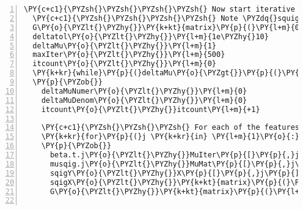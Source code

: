 \begin{Verbatim}[commandchars=\\\{\},codes={\catcode`\$=3\catcode`\^=7\catcode`\_=8},gobble=0,numbers=left,fontfamily=fvm,fontshape=n,fontsize=\footnotesize,tabsize=2]
  \PY{c+c1}{\PYZsh{}\PYZsh{}\PYZsh{}\PYZsh{} Now start iterative estimation of the $\ell_1$ penalised means}
  \PY{c+c1}{\PYZsh{}\PYZsh{}\PYZsh{}\PYZsh{} Note \PYZdq{}squig\PYZdq{} is used for the ML estimates}
  G\PY{o}{\PYZlt{}\PYZhy{}}\PY{k+kt}{matrix}\PY{p}{(}\PY{l+m}{0}\PY{p}{,}nrow\PY{o}{=}K\PY{p}{,}ncol\PY{o}{=}K\PY{p}{)}
  deltatol\PY{o}{\PYZlt{}\PYZhy{}}\PY{l+m}{1e\PYZhy{}10}
  deltaMu\PY{o}{\PYZlt{}\PYZhy{}}\PY{l+m}{1}
  maxIter\PY{o}{\PYZlt{}\PYZhy{}}\PY{l+m}{500}
  itcount\PY{o}{\PYZlt{}\PYZhy{}}\PY{l+m}{0}
  \PY{k+kr}{while}\PY{p}{(}deltaMu\PY{o}{\PYZgt{}}\PY{p}{(}\PY{l+m}{1e\PYZhy{}5}\PY{p}{)} \PY{o}{\PYZam{}\PYZam{}} itcount\PY{o}{\PYZlt{}}maxIter\PY{p}{)}
  \PY{p}{\PYZob{}}
    deltaMuNumer\PY{o}{\PYZlt{}\PYZhy{}}\PY{l+m}{0}
    deltaMuDenom\PY{o}{\PYZlt{}\PYZhy{}}\PY{l+m}{0}
    itcount\PY{o}{\PYZlt{}\PYZhy{}}itcount\PY{l+m}{+1}
    
    \PY{c+c1}{\PYZsh{}\PYZsh{}\PYZsh{} For each of the features}
    \PY{k+kr}{for}\PY{p}{(}j \PY{k+kr}{in} \PY{l+m}{1}\PY{o}{:}P\PY{p}{)} 
    \PY{p}{\PYZob{}}
      beta.t.j\PY{o}{\PYZlt{}\PYZhy{}}MuIter\PY{p}{[}\PY{p}{,}j\PY{p}{]}
      musqig.j\PY{o}{\PYZlt{}\PYZhy{}}MuMat\PY{p}{[}\PY{p}{,}j\PY{p}{]}
      sqigY\PY{o}{\PYZlt{}\PYZhy{}}X\PY{p}{[}\PY{p}{,}j\PY{p}{]}
      sqigX\PY{o}{\PYZlt{}\PYZhy{}}\PY{k+kt}{matrix}\PY{p}{(}\PY{l+m}{0}\PY{p}{,}nrow\PY{o}{=}N\PY{p}{,}ncol\PY{o}{=}K\PY{p}{)}
      G\PY{o}{\PYZlt{}\PYZhy{}}\PY{k+kt}{matrix}\PY{p}{(}\PY{l+m}{0}\PY{p}{,}nrow\PY{o}{=}K\PY{p}{,}ncol\PY{o}{=}K\PY{p}{)}
      

\end{Verbatim}
